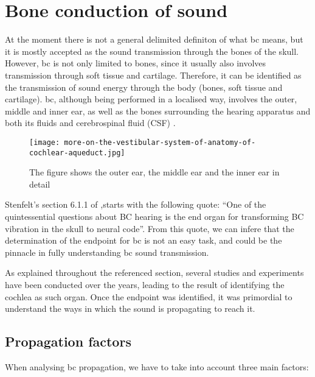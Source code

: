 \section{Bone conduction of sound}
At the moment there is not a general delimited definiton of what \gls{bc} means, but it is mostly accepted as the sound transmission through the bones of the skull. However, \gls{bc} is not only limited to bones, since it usually also involves transmission through soft tissue and cartilage. Therefore, it can be identified as the transmission of sound energy through the body (bones, soft tissue and cartilage). 
\gls{bc}, although being performed in a localised way, involves the outer, middle and inner ear, as well as the bones surrounding the hearing apparatus and both its fluids and cerebrospinal fluid (CSF) \citep{puria_2013}.
 \begin{figure}[H]
	\centering
		\texttt{[image: more-on-the-vestibular-system-of-anatomy-of-cochlear-aqueduct.jpg]}
		\caption{The figure shows the outer ear, the middle ear and the inner ear in detail}
		\label{fig:hearing_system_detail}
\end{figure}
Stenfelt's section 6.1.1 of \citep{puria_2013},starts with the following quote: \enquote{One of the quintessential questions about BC hearing is the end organ for
transforming BC vibration in the skull to neural code}. From this quote, we can infere that the determination of the endpoint for \gls{bc} is not an easy task, and could be the pinnacle in fully understanding \gls{bc} sound transmission.

As explained throughout the referenced section, several studies and experiments have been conducted over the years, leading to the result of identifying the cochlea as such organ. Once the endpoint was identified, it was primordial to understand the ways in which the sound is propagating to reach it.
\subsection{Propagation factors}

When analysing \gls{bc} propagation, we have to take into account three main factors:

